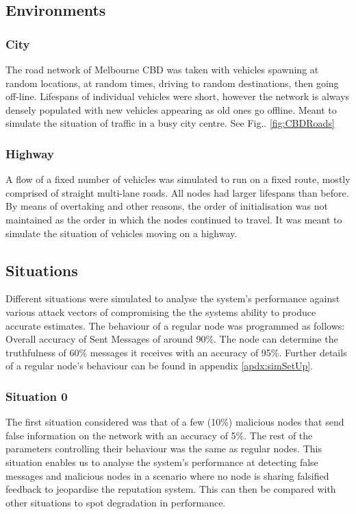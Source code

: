 \documentclass[journal]{IEEEtran}
\begin{document}
\subsection{Environments}
\label{sec:Experiments:env}
\subsubsection{City}
	The road network of Melbourne CBD was taken with vehicles spawning at random locations, at random times, driving to random destinations, then going off-line. Lifespans of individual vehicles were short, however the network is always densely populated with new vehicles appearing as old ones go offline.	Meant to simulate the situation of traffic in a busy city centre. See Fig.. \ref{fig:CBDRoads}	
\subsubsection{Highway}
	A flow of a fixed number of vehicles was simulated to run on a fixed route, mostly comprised of straight multi-lane roads. All nodes had larger lifespans than before. By means of overtaking and other reasons, the order of initialisation was not maintained as the order in which the nodes continued to travel. It was meant to simulate the situation of vehicles moving on a highway.
\subsection{Situations}
\label{sec:Experiments:sit}
Different situations were simulated to analyse the system's performance against various attack vectors of compromising the the systems ability to produce accurate estimates. The behaviour of a regular node was programmed as follows: Overall accuracy of Sent Messages of around 90\%. The node can determine the truthfulness of 60\% messages it receives with an accuracy of 95\%. %
Further details of a regular node's behaviour can be  found in appendix \ref{apdx:simSetUp}.
\subsubsection{Situation 0}
\label{sec:Experiments:sit:0}
The first situation considered was that of a few (10\%) malicious nodes that send false information on the network with an accuracy of 5\%. The rest of the parameters controlling their behaviour was the same as regular nodes. This situation enables us to analyse the system's performance at detecting false messages and malicious nodes in a scenario where no node is sharing falsified feedback to jeopardise the reputation system. This can then be compared with other situations to spot degradation in performance.
\end{document}
